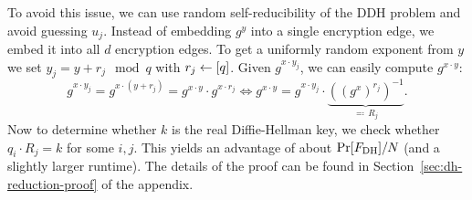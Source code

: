 To avoid this issue, we can use random self-reducibility of the DDH problem and avoid guessing $u_j$. Instead of embedding $g^y$ into a single encryption edge, we embed it into all $d$ encryption edges. To get a uniformly random exponent from $y$ we set $y_j = y + r_j \mod q$ with $r_j \leftarrow [q]$. Given $g^{x \cdot y_j}$, we can easily compute $g^{x \cdot y}$:
\[
	g^{x \cdot y_j} = g^{x \cdot (y + r_j)} = g^{x \cdot y}	\cdot g^{x \cdot r_j} \iff g^{x \cdot y} = g^{x \cdot y_j} \cdot \underbrace{((g^x)^{r_j})^{-1}}_{\eqqcolon \, R_j}.
\]
Now to determine whether $k$ is the real Diffie-Hellman key, we check whether $q_i \cdot R_j = k$ for some $i, j$. This yields an advantage of about $\pr{\fdh} / N$ (and a slightly larger runtime). The details of the proof can be found in Section~\ref{sec:dh-reduction-proof} of the appendix.

